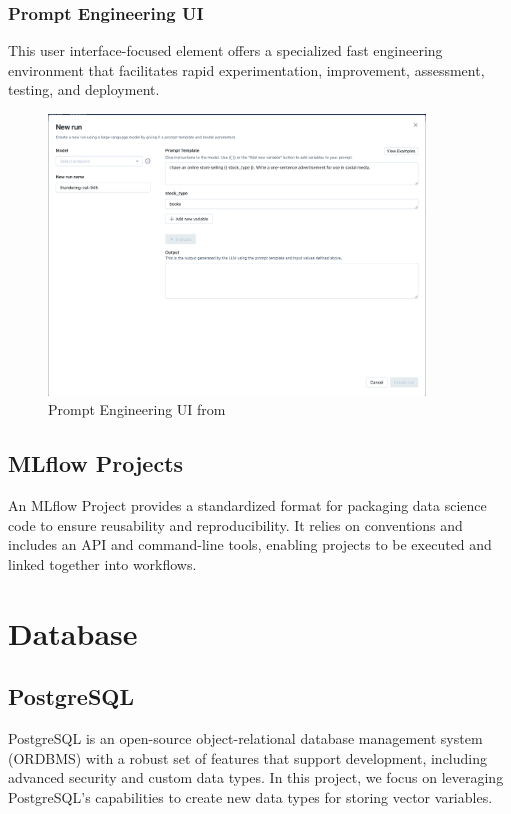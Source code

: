         \subsubsection{Prompt Engineering UI}
        This user interface-focused element offers a specialized fast engineering environment that facilitates rapid experimentation, improvement, assessment, testing, and deployment.
        \begin{figure}[H]
            \centering
            \includegraphics[width=10cm]{chapters/2/figures/prompt_modal_1-51ecbda29dcb90d4b7ed59a996470b87.png}
            \caption[Prompt Engineering UI]{Prompt Engineering UI  from~\cite{mlflow}}
            \label{fig:mlflow-prompt-engineering-ui}
        \end{figure}
        \subsection{MLflow Projects}
        An MLflow Project provides a standardized format for packaging data science code to ensure reusability and reproducibility. It relies on conventions and includes an API and command-line tools, enabling projects to be executed and linked together into workflows.


\section{Database}
    \subsection{PostgreSQL}
    PostgreSQL is an open-source object-relational database management system (ORDBMS) with a robust set of features that support development, including advanced security and custom data types. In this project, we focus on leveraging PostgreSQL's capabilities to create new data types for storing vector variables.
